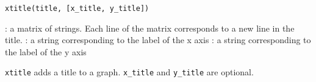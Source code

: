 
\begin{mandesc}
\end{mandesc}

\begin{calling_sequence}
\begin{verbatim}
xtitle(title, [x_title, y_title])
\end{verbatim}
\end{calling_sequence}
\begin{parameters}
  \begin{varlist}
    : a matrix of strings. Each line of the matrix corresponds to a new line
    in the title.
    : a string corresponding to the label of the x axis
    : a string corresponding to the label of the y axis
\end{varlist}
\end{parameters}

\begin{mandescription}
  \verb+xtitle+ adds a title to a graph. \verb+x_title+ and \verb+y_title+ are optional.
\end{mandescription}

\begin{examples}
  \begin{program}
  \end{program}
\end{examples}

\begin{manseealso}
\end{manseealso}


